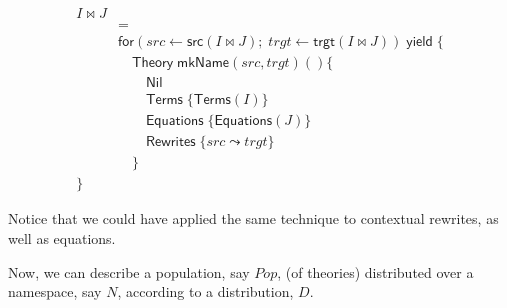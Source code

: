 \documentclass{article}
\begin{document}
\begin{align*}
  I \Join J \\
  & = \\
  & \mathsf{for}( src \leftarrow \mathsf{src}( I \Join J ); \; trgt \leftarrow \mathsf{trgt}( I \Join J ) ) \; \mathsf{yield}\; \{ \\
  & \quad \mathsf{Theory}\; \mathsf{mkName}( src, trgt )() \{ \\
       & \quad \quad \mathsf{Nil} \\
    & \quad \quad \mathsf{Terms}\; \{ \mathsf{Terms}( I ) \} \\
    & \quad \quad \mathsf{Equations}\; \{ \mathsf{Equations}( J ) \} \\
    & \quad \quad \mathsf{Rewrites}\; \{ src \leadsto trgt \} \\
  & \quad \} \\
  \}
\end{align*}

Notice that we could have applied the same technique to contextual rewrites,
as well as equations.

Now, we can describe a population, say $Pop$, (of theories) distributed over a
namespace, say $N$, according to a distribution, $D$.
\end{document}
